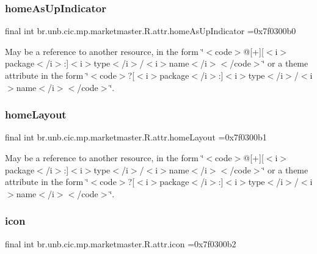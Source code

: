 \subsubsection{\texorpdfstring{home\+As\+Up\+Indicator}{homeAsUpIndicator}}
{\footnotesize\ttfamily final int br.\+unb.\+cic.\+mp.\+marketmaster.\+R.\+attr.\+home\+As\+Up\+Indicator =0x7f0300b0\hspace{0.3cm}{\ttfamily [static]}}

May be a reference to another resource, in the form \char`\"{}$<$code$>$@\mbox{[}+\mbox{]}\mbox{[}$<$i$>$package$<$/i$>$\+:\mbox{]}$<$i$>$type$<$/i$>$/$<$i$>$name$<$/i$>$$<$/code$>$\char`\"{} or a theme attribute in the form \char`\"{}$<$code$>$?\mbox{[}$<$i$>$package$<$/i$>$\+:\mbox{]}$<$i$>$type$<$/i$>$/$<$i$>$name$<$/i$>$$<$/code$>$\char`\"{}. \mbox{\label{classbr_1_1unb_1_1cic_1_1mp_1_1marketmaster_1_1R_1_1attr_a41c10229fb3df1e2fc83fa24907c451c}} 
\subsubsection{\texorpdfstring{home\+Layout}{homeLayout}}
{\footnotesize\ttfamily final int br.\+unb.\+cic.\+mp.\+marketmaster.\+R.\+attr.\+home\+Layout =0x7f0300b1\hspace{0.3cm}{\ttfamily [static]}}

May be a reference to another resource, in the form \char`\"{}$<$code$>$@\mbox{[}+\mbox{]}\mbox{[}$<$i$>$package$<$/i$>$\+:\mbox{]}$<$i$>$type$<$/i$>$/$<$i$>$name$<$/i$>$$<$/code$>$\char`\"{} or a theme attribute in the form \char`\"{}$<$code$>$?\mbox{[}$<$i$>$package$<$/i$>$\+:\mbox{]}$<$i$>$type$<$/i$>$/$<$i$>$name$<$/i$>$$<$/code$>$\char`\"{}. \mbox{\label{classbr_1_1unb_1_1cic_1_1mp_1_1marketmaster_1_1R_1_1attr_a678c1c393533e57c2997242c204e5a17}} 
\subsubsection{\texorpdfstring{icon}{icon}}
{\footnotesize\ttfamily final int br.\+unb.\+cic.\+mp.\+marketmaster.\+R.\+attr.\+icon =0x7f0300b2\hspace{0.3cm}{\ttfamily [static]}}

